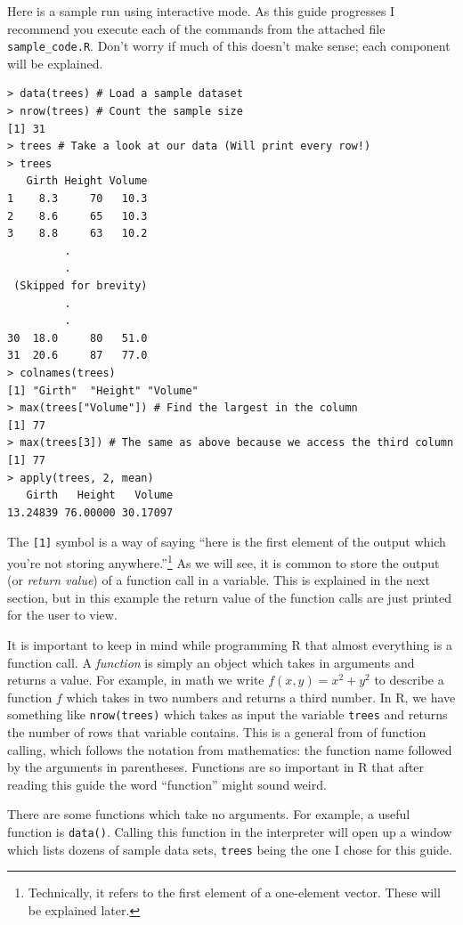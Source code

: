 \documentclass[12pt]{article}
\begin{document}
Here is a sample run using interactive mode. As this guide progresses I recommend you execute each of the commands from the attached file \verb|sample_code.R|. Don't worry if much of this doesn't make sense; each component will be explained.

\begin{Verbatim}[frame=single, fontsize=\small]
> data(trees) # Load a sample dataset
> nrow(trees) # Count the sample size
[1] 31
> trees # Take a look at our data (Will print every row!)
> trees
   Girth Height Volume
1    8.3     70   10.3
2    8.6     65   10.3
3    8.8     63   10.2
         .
         .
 (Skipped for brevity)
         .
         .
30  18.0     80   51.0
31  20.6     87   77.0
> colnames(trees)
[1] "Girth"  "Height" "Volume"
> max(trees["Volume"]) # Find the largest in the column
[1] 77
> max(trees[3]) # The same as above because we access the third column
[1] 77
> apply(trees, 2, mean)
   Girth   Height   Volume 
13.24839 76.00000 30.17097
\end{Verbatim}
The \verb|[1]| symbol is a way of saying ``here is the first element of the output which you're not storing anywhere.''\footnote{Technically, it refers to the first element of a one-element vector. These will be explained later.} As we will see, it is common to store the output (or \emph{return value}) of a function call in a variable. This is explained in the next section, but in this example the return value of the function calls are just printed for the user to view.

It is important to keep in mind while programming R that almost everything is a function call. A \emph{function} is simply an object which takes in arguments and returns a value. For example, in math we write $f(x, y) = x^2 + y^2$ to describe a function $f$ which takes in two numbers and returns a third number. In R, we have something like \verb|nrow(trees)| which takes as input the variable \verb|trees| and returns the number of rows that variable contains. This is a general from of function calling, which follows the notation from mathematics: the function name followed by the arguments in parentheses. Functions are so important in R that after reading this guide the word ``function'' might sound weird.

There are some functions which take no arguments. For example, a useful function is \verb|data()|. Calling this function in the interpreter will open up a window which lists dozens of sample data sets, \verb|trees| being the one I chose for this guide.
\end{document}

